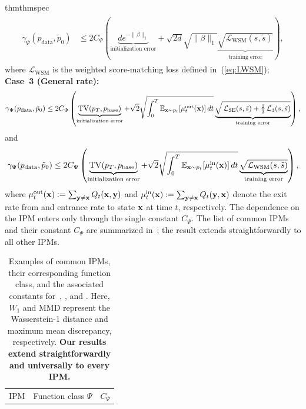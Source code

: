 \documentclass{article} %
\def\eqref#1{equation~\ref{#1}}
\newcommand{\bfx}{{\bf x}}
\newcommand{\bfy}{ {\bf y}}
\newcommand{\TV}{\mathrm{TV}}
\newcommand{\LWSM}{\mathcal{L}_{\mathrm{WSM}}}
\newcommand{\LSE}{\mathcal{L}_{\mathrm{SE}}}
\renewcommand{\eqref}[1]{\textup{(\ref{#1})}}
\newcommand{\LThree}{\mathcal{L}_{3}}
\begin{document}
\begin{restatable}{thm}{thmspec}
\begin{equation}
\end{equation}
\begin{align}
\begin{split}
\gamma_\Psi(p_{\mathrm{data}}, \tilde{p}_0)  &\leq 2 C_\Psi \left( \underbrace{d e^{-\| \beta \|_1}}_{\text{initialization error}}  +  \sqrt{2d} \sqrt{\|\beta \|_1}  \underbrace{\sqrt{\LWSM(s, \tilde{s})}}_{\text{training error}} \right),
\end{split}
\end{align}
where $\LWSM$ is the weighted score-matching loss defined in~\eqref{eq:LWSM};\\
\textbf{Case~3 (General rate):} 
\begin{equation}\label{eq:general_bound_LSE}
    \gamma_\Psi(p_{\mathrm{data}}, \tilde{p}_0) \leq 2 C_\Psi \left( \underbrace{\TV(p_T, p_{\rm base})}_{\text{initialization error}} +  \sqrt{2} \sqrt{ \int_0^T \mathbb{E}_{\bfx \sim p_t}\!\left[ \mu^\mathrm{out}_t(\bfx) \right] dt }  \underbrace{\sqrt{\,\LSE(s, \tilde{s}) + \tfrac{2}{3}\,\LThree(s, \tilde{s})}}_{\text{training error}} \right), 
\end{equation}
and
\begin{equation}\label{eq:general_bound_LWSM}
    \gamma_\Psi(p_{\mathrm{data}}, \tilde{p}_0) \leq 2 C_\Psi \left( \underbrace{\TV(p_T, p_{\rm base})}_{\text{initialization error}} +  \sqrt{2} \sqrt{ \int_0^T \mathbb{E}_{\bfx \sim p_t}\!\left[ \mu^\mathrm{in}_t(\bfx) \right] dt }  \underbrace{\sqrt{\LWSM(s, \tilde{s})}}_{\text{training error}} \right),
\end{equation}
where $\mu^\mathrm{out}_t(\bfx):=\sum_{\bfy \neq \bfx} Q_t(\bfx, \bfy)$ and $\mu^\mathrm{in}_t(\bfx):=\sum_{\bfy \neq \bfx} Q_t(\bfy, \bfx)$ denote the exit rate from and entrance rate to state $\bfx$ at time $t$, respectively.
The dependence on the IPM enters only through
the single constant $C_\Psi$. The list of common IPMs and their constant $C_\Psi$ are summarized in~; the result extends straightforwardly to all other IPMs.
\begin{table}[!ht]
\centering
\caption{Examples of common IPMs, their corresponding function class, and the associated constants for~, , and .  Here, $W_1$ and MMD represent the Wasserstein-1 distance and maximum mean discrepancy, respectively. \textbf{Our results extend straightforwardly and universally to every IPM.\label{table:IPM}}}
\renewcommand{\arraystretch}{1.05}
\begin{tabular}{lll}
\toprule
IPM & Function class $\Psi$ & $C_\Psi$ \\

\end{tabular}
\end{table}
\end{restatable}
\end{document}
